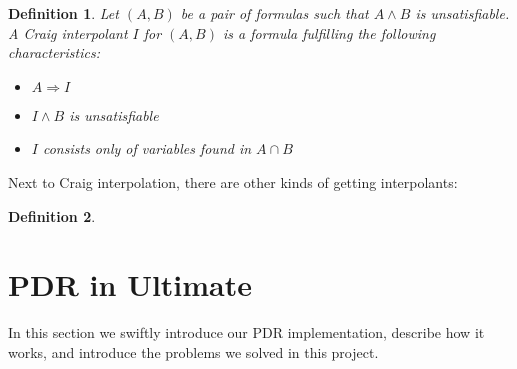 \documentclass{article}
\newtheorem{mydef}{Definition}
\newcommand\mycom[1]{}
\newcommand\mycom[1]{#1}
\newcommand{\jw}[1]{\mycom{\todo[color=blue!40,inline]{\small JW: #1}}}
\begin{document}
	\begin{mydef}
		Let $(A, B)$ be a pair of formulas such that $A \land B$ is unsatisfiable. A Craig interpolant $I$ for $(A, B)$ is a formula fulfilling the following characteristics:
		\begin{itemize}
			\item $A \Rightarrow I$
			\item $I \land B$ is unsatisfiable
			\item $I$ consists only of variables found in $A \cap B$
		\end{itemize}
	\end{mydef}

	Next to Craig interpolation, there are other kinds of getting interpolants:
	\begin{mydef}
		\jw{Introduce Selfless interpolation}
	\end{mydef}
	\pagebreak
	
	\section{PDR in Ultimate}
	In this section we swiftly introduce our PDR implementation, describe how it works, and introduce the problems we solved in this project.
	
\end{document}
